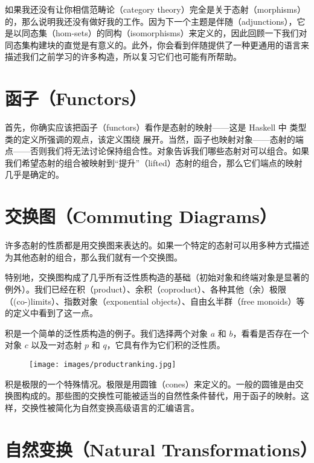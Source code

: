 
\lettrine[lhang=0.17]{如}{果我还没有}让你相信范畴论（category theory）完全是关于态射（morphisms）的，那么说明我还没有做好我的工作。因为下一个主题是伴随（adjunctions），它是以同态集（hom-sets）的同构（isomorphisms）来定义的，因此回顾一下我们对同态集构建块的直觉是有意义的。此外，你会看到伴随提供了一种更通用的语言来描述我们之前学习的许多构造，所以复习它们也可能有所帮助。

\section{函子（Functors）}

首先，你确实应该把函子（functors）看作是态射的映射——这是 Haskell 中  类型类的定义所强调的观点，该定义围绕  展开。当然，函子也映射对象——态射的端点——否则我们将无法讨论保持组合性。对象告诉我们哪些态射对可以组合。如果我们希望态射的组合被映射到“提升”（lifted）态射的组合，那么它们端点的映射几乎是确定的。

\section{交换图（Commuting Diagrams）}

许多态射的性质都是用交换图来表达的。如果一个特定的态射可以用多种方式描述为其他态射的组合，那么我们就有一个交换图。

特别地，交换图构成了几乎所有泛性质构造的基础（初始对象和终端对象是显著的例外）。我们已经在积（product）、余积（coproduct）、各种其他（余）极限（(co-)limits）、指数对象（exponential objects）、自由幺半群（free monoids）等的定义中看到了这一点。

积是一个简单的泛性质构造的例子。我们选择两个对象 $a$ 和 $b$，看看是否存在一个对象 $c$ 以及一对态射 $p$ 和 $q$，它具有作为它们积的泛性质。

\begin{figure}[H]
  \centering
  \texttt{[image: images/productranking.jpg]}
\end{figure}

\noindent
积是极限的一个特殊情况。极限是用圆锥（cones）来定义的。一般的圆锥是由交换图构成的。那些图的交换性可能被适当的自然性条件替代，用于函子的映射。这样，交换性被简化为自然变换高级语言的汇编语言。

\section{自然变换（Natural Transformations）}

